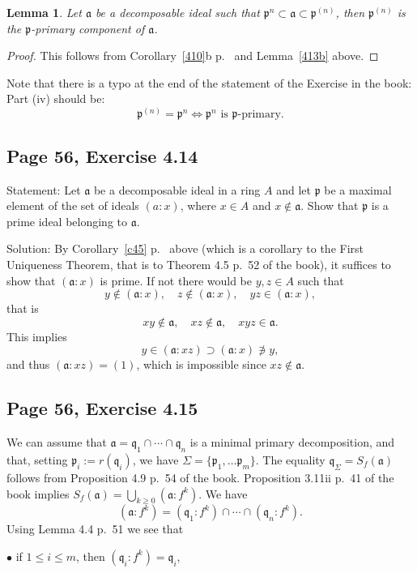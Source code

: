 \documentclass[parskip=half,fontsize=12pt]{scrartcl}%
\newcommand{\mf}{\mathfrak}
\newcommand{\aaa}{\mf a}
\newcommand{\ppp}{\mf p}
\newcommand{\qqq}{\mf q}
\newcommand{\bu}{\bullet}
\newtheorem{lem}[thm]{Lemma}
\begin{document}
\begin{lem}
Let $\aaa$ be a decomposable ideal such that $\ppp^n\subset\aaa\subset\ppp^{(n)}$, then $\ppp^{(n)}$ is the $\ppp$-primary component of $\aaa$. 
\end{lem}
\begin{proof}
This follows from Corollary~\ref{410}b p.~\pageref{410} and Lemma~\ref{413b} above.
\end{proof}

Note that there is a typo at the end of the statement of the Exercise in the book: Part (iv) should be: 
$$
\ppp^{(n)}=\ppp^n\iff\ppp^n\text{ is }\ppp\text{-primary.}
$$ 

\subsection{Page 56, Exercise 4.14}%

Statement: Let $\aaa$ be a decomposable ideal in a ring $A$ and let $\ppp$ be a maximal element of the set of ideals $(a:x)$, where $x\in A$ and $x\notin\aaa$. Show that $\ppp$ is a prime ideal belonging to $\aaa$.

Solution: By Corollary~\ref{c45} p.~\pageref{c45} above (which is a corollary to the First Uniqueness Theorem, that is to Theorem 4.5 p.~52 of the book), it suffices to show that $(\aaa:x)$ is prime. If not there would be $y,z\in A$ such that 
$$
y\notin(\aaa:x),\quad z\notin(\aaa:x),\quad yz\in(\aaa:x),
$$ 
that is 
$$
xy\notin\aaa,\quad xz\notin\aaa,\quad xyz\in\aaa.
$$ 
This implies 
$$
y\in(\aaa:xz)\supset(\aaa:x)\not\ni y,
$$ 
and thus $(\aaa:xz)=(1)$, which is impossible since $xz\notin\aaa$.

\subsection{Page 56, Exercise 4.15}%

We can assume that $\aaa=\qqq_1\cap\cdots\cap\qqq_n$ is a minimal primary decomposition, and that, setting $\ppp_i:=r(\qqq_i)$, we have $\Sigma=\{\ppp_1,\dots\ppp_m\}$. The equality $\qqq_\Sigma=S_f(\aaa)$ follows from Proposition 4.9 p.~54 of the book. Proposition 3.11ii p.~41 of the book implies $S_f(\aaa)=\bigcup_{k\ge0}(\aaa:f^k)$. We have 
\begin{equation}\label{afk}
(\aaa:f^k)=(\qqq_1:f^k)\cap\cdots\cap(\qqq_n:f^k).
\end{equation} 
Using Lemma 4.4 p.~51 we see that  

$\bu$ if $1\le i\le m$, then $(\qqq_i:f^k)=\qqq_i$,  
\end{document}
